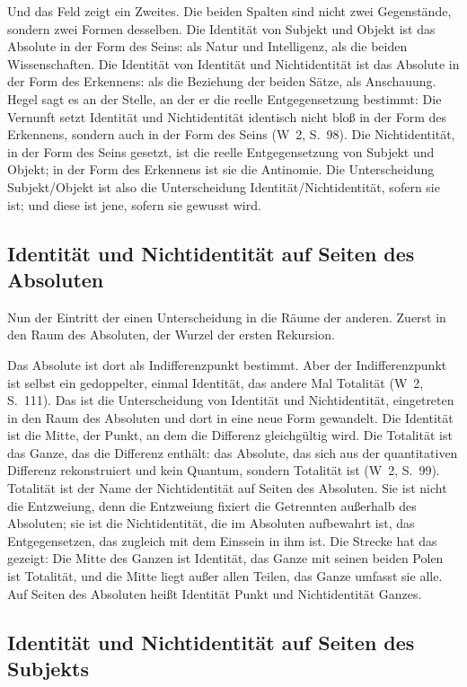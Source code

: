 \documentclass[11pt,a4paper]{article}
\newcommand{\Werke}[1]{(W~2, S.~#1)}
\begin{document}
Und das Feld zeigt ein Zweites. Die beiden Spalten sind nicht zwei Gegenstände, sondern zwei Formen desselben. Die Identität von Subjekt und Objekt ist das Absolute in der Form des Seins: als Natur und Intelligenz, als die beiden Wissenschaften. Die Identität von Identität und Nichtidentität ist das Absolute in der Form des Erkennens: als die Beziehung der beiden Sätze, als Anschauung. Hegel sagt es an der Stelle, an der er die reelle Entgegensetzung bestimmt: Die Vernunft setzt Identität und Nichtidentität identisch \glqq nicht bloß in der Form des Erkennens, sondern auch in der Form des Seins\grqq{} \Werke{98}. Die Nichtidentität, in der Form des Seins gesetzt, ist die reelle Entgegensetzung von Subjekt und Objekt; in der Form des Erkennens ist sie die Antinomie. Die Unterscheidung Subjekt/Objekt ist also die Unterscheidung Identität/Nichtidentität, sofern sie ist; und diese ist jene, sofern sie gewusst wird.

\subsection{Identität und Nichtidentität auf Seiten des Absoluten}

Nun der Eintritt der einen Unterscheidung in die Räume der anderen. Zuerst in den Raum des Absoluten, der Wurzel der ersten Rekursion.

Das Absolute ist dort als Indifferenzpunkt bestimmt. Aber der Indifferenzpunkt ist \glqq selbst ein gedoppelter, einmal Identität, das andere Mal Totalität\grqq{} \Werke{111}. Das ist die Unterscheidung von Identität und Nichtidentität, eingetreten in den Raum des Absoluten und dort in eine neue Form gewandelt. Die Identität ist die Mitte, der Punkt, an dem die Differenz gleichgültig wird. Die Totalität ist das Ganze, das die Differenz enthält: das Absolute, das \glqq sich aus der quantitativen Differenz rekonstruiert\grqq{} und \glqq kein Quantum, sondern Totalität\grqq{} ist \Werke{99}. Totalität ist der Name der Nichtidentität auf Seiten des Absoluten. Sie ist nicht die Entzweiung, denn die Entzweiung fixiert die Getrennten außerhalb des Absoluten; sie ist die Nichtidentität, die im Absoluten aufbewahrt ist, das Entgegensetzen, das zugleich mit dem Einssein in ihm ist. Die Strecke hat das gezeigt: Die Mitte des Ganzen ist Identität, das Ganze mit seinen beiden Polen ist Totalität, und die Mitte liegt außer allen Teilen, das Ganze umfasst sie alle. Auf Seiten des Absoluten heißt Identität Punkt und Nichtidentität Ganzes.

\subsection{Identität und Nichtidentität auf Seiten des Subjekts}
\end{document}
